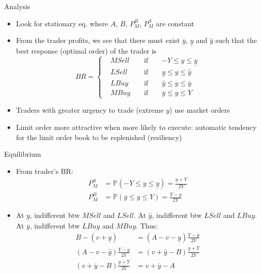 \documentclass[english,10pt]{beamer}
\begin{document}
\begin{frame}{Analysis}
	\begin{itemize}
		\item Look for stationary eq. where  $A$, $B$, $P^B_M$, $P^S_M$ are constant 
		\item From the trader profits, we see that there must exist $\overline{y}$,  $\underline{y}$ and $\hat{y}$ such that the best response (optimal order) of the trader is
		\begin{equation*}
		BR=\left\{ \begin{aligned}
		&MSell		&& 	\text{ if } 	&&	-Y\le y \le \underline{y} \\
		&LSell 		&&	\text{ if } 	&&	\underline{y} \le y \le \hat{y} \\
		&LBuy		&&	\text{ if } 	&&	\hat{y} \le y \le \overline{y} \\
		&MBuy	&&	\text{ if } 	&&	\overline{y} \le y \le Y
		\end{aligned}
		\right.
		\end{equation*}
		\item Traders with greater urgency to trade (extreme $y$) use market orders
		\item Limit order more attractive when more likely to execute:  automatic tendency for the limit order book to be replenished (resiliency)
	\end{itemize}
\end{frame}


\begin{frame}{Equilibrium}
	\begin{itemize}
		\item From trader's BR:
		\begin{align*}
		P^S_M 	&=\mathbb{P}(-Y\le y \le \underline{y})=\frac{\underline{y}+Y}{2Y} \\
		P^B_M 	&=\mathbb{P}(\overline{y} \le y \le Y)=\frac{Y-\overline{y}}{2Y}
		\end{align*}
		\item At $\underline{y}$, indifferent btw $MSell$ and $LSell$. At $\hat{y}$, indifferent btw $LSell$ and $LBuy$. At $\overline{y}$, indifferent btw $LBuy$ and $MBuy$. Thus:
		\begin{align}
		B-(v+\underline{y}) 					& = (A-v-\underline{y})\frac{Y-\overline{y}}{2Y} \label{eq1}\\
		(A-v-\hat{y}) \frac{Y-\overline{y}}{2Y} 			& = (v+\hat{y}-B)\frac{\underline{y}+Y}{2Y} \label{eq2}\\
		(v+\overline{y}-B) \frac{\underline{y}+Y}{2Y}  	& = v+\overline{y}-A \label{eq3}
		\end{align}
	\end{itemize}
\end{frame}
\end{document}
